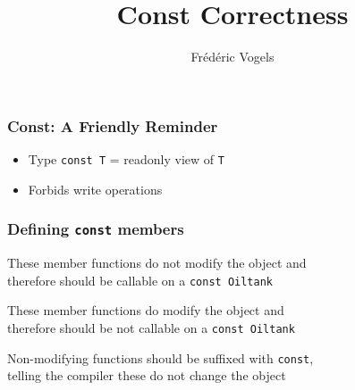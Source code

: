 \usepackage{ucll-code}
\usetikzlibrary{shadows,shapes.multipart}

\title{Const Correctness}
\author{Fr\'ed\'eric Vogels}



\begin{frame}
  \titlepage
\end{frame}

\begin{frame}
  \frametitle{Const: A Friendly Reminder}
  \begin{itemize}
    \item Type {\tt const T} = readonly view of {\tt T}
    \item Forbids write operations
  \end{itemize}
  \vskip5mm
  \begin{overprint}

  \end{overprint}
  \vskip5mm
\end{frame}

\begin{frame}
  \frametitle{Defining {\tt const} members}
  \begin{overprint}
    \begin{center}
      These member functions do not modify the object
      and \\ therefore should be callable on a \texttt{const Oiltank}
    \end{center}

    \begin{center}
      These member functions do modify the object
      and \\ therefore should be not callable on a \texttt{const Oiltank}
    \end{center}

    \begin{center}
      Non-modifying functions should be suffixed with \texttt{const},\\
      telling the compiler these do not change the object
    \end{center}
  \end{overprint}
\end{frame}

